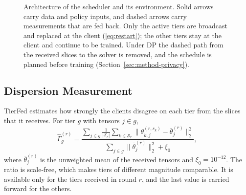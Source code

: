 \documentclass[journal]{IEEEtran}
\newcommand{\tierfed}{TierFed}
\newcommand{\Gh}{\hat\Gamma}
\begin{document}
\begin{figure}[t]
\caption{Architecture of the scheduler and its environment. Solid arrows carry data and policy inputs, and dashed arrows carry measurements that are fed back. Only the active tiers are broadcast and replaced at the client (\ref{eq:restart}); the other tiers stay at the client and continue to be trained. Under DP the dashed path from the received slices to the solver is removed, and the schedule is planned before training (Section~\ref{sec:method-privacy}).}
\label{fig:arch}
\end{figure}

\subsection{Dispersion Measurement}
\label{sec:dispersion}
\tierfed{} estimates how strongly the clients disagree on each tier from the slices that it receives. For tier $g$ with tensors $j\in g$,
\begin{equation}
\Gh_g^{(r)}=\frac{\sum_{j\in g}\frac1{|\mathcal S_r|}\sum_{k\in\mathcal S_r}\big\|\theta_{k,j}^{(r,s_k)}-\bar\theta_j^{(r)}\big\|_2^2}{\sum_{j\in g}\big\|\bar\theta_j^{(r)}\big\|_2^2+\xi_0},
\label{eq:gammahat}
\end{equation}
where $\bar\theta_j^{(r)}$ is the unweighted mean of the received tensors and $\xi_0=10^{-12}$. The ratio is scale-free, which makes tiers of different magnitude comparable. It is available only for the tiers received in round $r$, and the last value is carried forward for the others.
\end{document}
